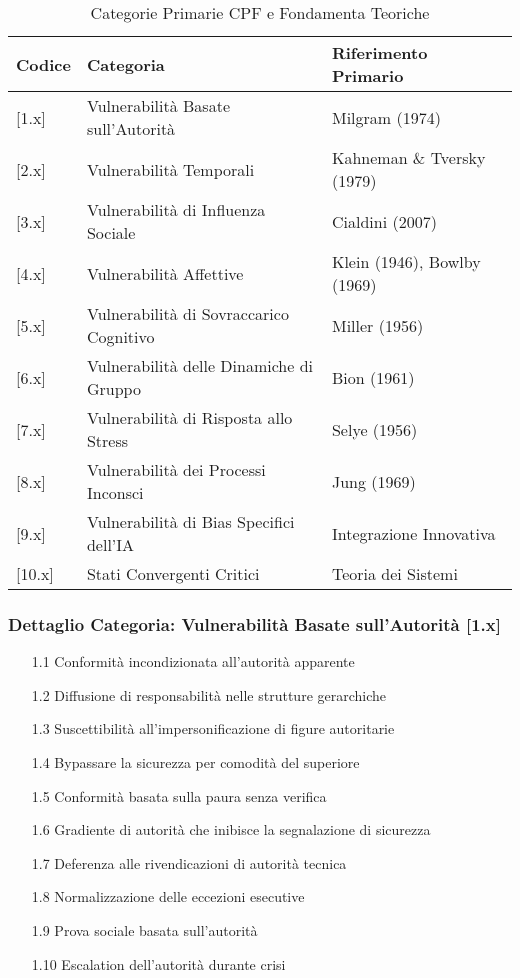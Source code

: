 \documentclass[11pt,a4paper]{article}
\begin{document}
\begin{table}[h!]
\centering
\caption{Categorie Primarie CPF e Fondamenta Teoriche}
\label{tab:categories}
\begin{tabular}{lll}
\toprule
Codice & Categoria & Riferimento Primario \\
\midrule
{[}1.x{]} & Vulnerabilità Basate sull'Autorità & Milgram (1974) \\
{[}2.x{]} & Vulnerabilità Temporali & Kahneman \& Tversky (1979) \\
{[}3.x{]} & Vulnerabilità di Influenza Sociale & Cialdini (2007) \\
{[}4.x{]} & Vulnerabilità Affettive & Klein (1946), Bowlby (1969) \\
{[}5.x{]} & Vulnerabilità di Sovraccarico Cognitivo & Miller (1956) \\
{[}6.x{]} & Vulnerabilità delle Dinamiche di Gruppo & Bion (1961) \\
{[}7.x{]} & Vulnerabilità di Risposta allo Stress & Selye (1956) \\
{[}8.x{]} & Vulnerabilità dei Processi Inconsci & Jung (1969) \\
{[}9.x{]} & Vulnerabilità di Bias Specifici dell'IA & Integrazione Innovativa \\
{[}10.x{]} & Stati Convergenti Critici & Teoria dei Sistemi \\
\bottomrule
\end{tabular}
\end{table}

\FloatBarrier  %

\subsubsection{Dettaglio Categoria: Vulnerabilità Basate sull'Autorità [1.x]}

\begin{enumerate}
\item[1.1] Conformità incondizionata all'autorità apparente
\item[1.2] Diffusione di responsabilità nelle strutture gerarchiche
\item[1.3] Suscettibilità all'impersonificazione di figure autoritarie
\item[1.4] Bypassare la sicurezza per comodità del superiore
\item[1.5] Conformità basata sulla paura senza verifica
\item[1.6] Gradiente di autorità che inibisce la segnalazione di sicurezza
\item[1.7] Deferenza alle rivendicazioni di autorità tecnica
\item[1.8] Normalizzazione delle eccezioni esecutive
\item[1.9] Prova sociale basata sull'autorità
\item[1.10] Escalation dell'autorità durante crisi
\end{enumerate}
\end{document}
